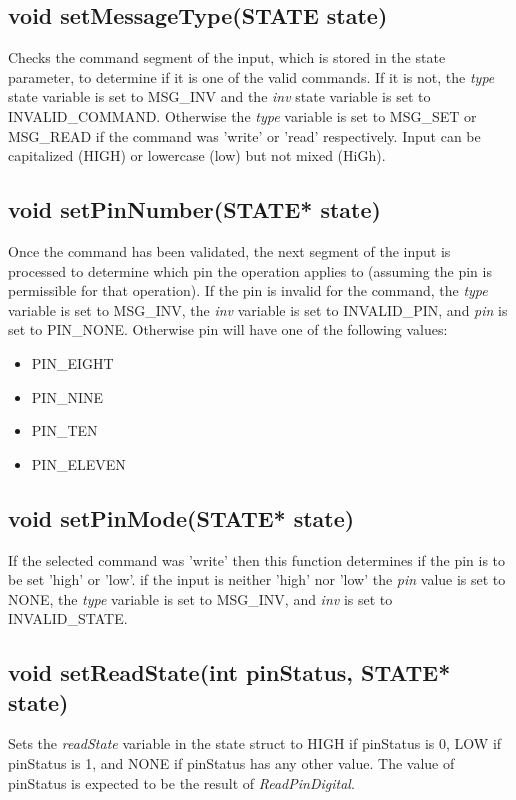 \documentclass[letterpaper,11pt]{texMemo} %
\begin{document}
\subsection*{void setMessageType(STATE state)}
Checks the command segment of the input, which is stored in the state parameter, to determine if it is one of the valid commands. If it is not, the \textit{type} state variable is set to MSG\_INV and the \textit{inv} state variable is set to INVALID\_COMMAND. Otherwise the \textit{type} variable is set to MSG\_SET or MSG\_READ if the command was 'write' or 'read' respectively. Input can be capitalized (HIGH) or lowercase (low) but not mixed (HiGh).
\subsection*{void setPinNumber(STATE* state)}
Once the command has been validated, the next segment of the input is processed to determine which pin the operation applies to (assuming the pin is permissible for that operation). If the pin is invalid for the command, the \textit{type} variable is set to MSG\_INV, the \textit{inv} variable is set to INVALID\_PIN, and \textit{pin} is set to PIN\_NONE. Otherwise pin will have one of the following values:
\begin{itemize}
\item PIN\_EIGHT\\
\item PIN\_NINE\\
\item PIN\_TEN\\
\item PIN\_ELEVEN
\end{itemize}
\subsection*{void setPinMode(STATE* state)}
If the selected command was 'write' then this function determines if the pin is to be set 'high' or 'low'. if the input is neither 'high' nor 'low' the \textit{pin} value is set to NONE, the \textit{type} variable is set to MSG\_INV, and \textit{inv} is set to INVALID\_STATE.
\subsection*{void setReadState(int pinStatus, STATE* state)}
Sets the \textit{readState} variable in the state struct to HIGH if pinStatus is 0, LOW if pinStatus is 1, and NONE if pinStatus has any other value. The value of pinStatus is expected to be the result of \textit{ReadPinDigital}.
\end{document}
